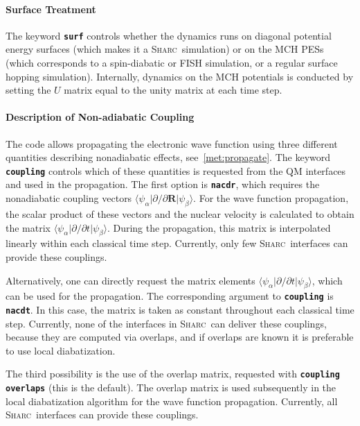 \documentclass[a4paper,10pt,DIV=15,openany,twoside=false]{scrbook}
\newcommand{\sharc}{\textsc{Sharc}}
\newcommand{\todo}[1]{\textcolor{RL}{#1}}
\newcommand{\ttt}[1]{\textbf{\texttt{#1}}}
\newcommand{\VEC}[1]{\ensuremath{\mathbf{#1}}}
\begin{document}
\paragraph{Surface Treatment}

The keyword \ttt{surf} controls whether the dynamics runs on diagonal potential energy surfaces (which makes it a \sharc\ simulation) or on the MCH PESs (which corresponds to a spin-diabatic \cite{Granucci2012JCP} or FISH \cite{Mitric2009PRA} simulation, or a regular surface hopping simulation). Internally, dynamics on the MCH potentials is conducted by setting the $U$ matrix equal to the unity matrix at each time step. 

\paragraph{Description of Non-adiabatic Coupling}

The code allows propagating the electronic wave function using three different quantities describing nonadiabatic effects, see~\ref{met:propagate}. The keyword \ttt{coupling} controls which of these quantities is requested from the QM interfaces and used in the propagation. The first option is \ttt{nacdr}, which requires the nonadiabatic coupling vectors $\langle\psi_\alpha|\partial/\partial \VEC{R}|\psi_\beta\rangle$. For the wave function propagation, the scalar product of these vectors and the nuclear velocity is calculated to obtain the matrix $\langle\psi_\alpha|\partial/\partial t|\psi_\beta\rangle$. During the propagation, this matrix is interpolated linearly within each classical time step. Currently, only few \sharc\ interfaces can provide these couplings.

Alternatively, one can directly request the matrix elements $\langle\psi_\alpha|\partial/\partial t|\psi_\beta\rangle$, which can be used for the propagation. The corresponding argument to \ttt{coupling} is \ttt{nacdt}. In this case, the matrix is taken as constant throughout each classical time step. \todo{Currently, none of the interfaces in \sharc\ can deliver these couplings, because they are computed via overlaps, and if overlaps are known it is preferable to use local diabatization.}

The third possibility is the use of the overlap matrix, requested with \ttt{coupling overlaps} (this is the default). The overlap matrix is used subsequently in the local diabatization algorithm for the wave function propagation. Currently, all \sharc\ interfaces can provide these couplings.
\end{document}
